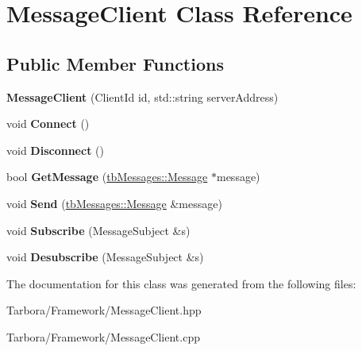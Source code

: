 \hypertarget{classMessageClient}{}\section{Message\+Client Class Reference}
\label{classMessageClient}
\subsection*{Public Member Functions}
\begin{DoxyCompactItemize}
\item 
\mbox{\label{classMessageClient_aeaa28f7dc522d3bdf6dd547eef813d76}} 
{\bfseries Message\+Client} (Client\+Id id, std\+::string server\+Address)
\item 
\mbox{\label{classMessageClient_a45783f1e9aec050f513c57029820399c}} 
void {\bfseries Connect} ()
\item 
\mbox{\label{classMessageClient_a984f483bb495d0ba920d467606971fee}} 
void {\bfseries Disconnect} ()
\item 
\mbox{\label{classMessageClient_a32e3aa733b7039715bc4d8a61381fa86}} 
bool {\bfseries Get\+Message} (\hyperlink{classtbMessages_1_1Message}{tb\+Messages\+::\+Message} $\ast$message)
\item 
\mbox{\label{classMessageClient_a6901aaf3ee52876016992ab9afcbb048}} 
void {\bfseries Send} (\hyperlink{classtbMessages_1_1Message}{tb\+Messages\+::\+Message} \&message)
\item 
\mbox{\label{classMessageClient_adeb20e9b1973074c91953c3a9689e15d}} 
void {\bfseries Subscribe} (Message\+Subject \&s)
\item 
\mbox{\label{classMessageClient_a83a370ce2e1d56a1ecd9a5a55dc8016a}} 
void {\bfseries Desubscribe} (Message\+Subject \&s)
\end{DoxyCompactItemize}


The documentation for this class was generated from the following files\+:\begin{DoxyCompactItemize}
\item 
Tarbora/\+Framework/Message\+Client.\+hpp\item 
Tarbora/\+Framework/Message\+Client.\+cpp\end{DoxyCompactItemize}
